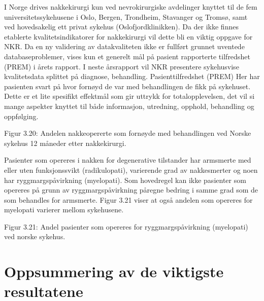 \documentclass [norsk,a4paper,twoside]{article}\usepackage[]{graphicx}\usepackage[]{color}
\begin{document}
I Norge drives nakkekirurgi kun ved nevrokirurgiske avdelinger knyttet til de fem
universitetssykehusene i Oslo, Bergen, Trondheim, Stavanger og Tromsø, samt ved
hovedsakelig ett privat sykehus (Oslofjordklinikken).
Da der ikke finnes etablerte kvalitetsindikatorer for nakkekirurgi vil dette bli en
viktig oppgave for NKR. Da en ny validering av datakvaliteten ikke er fullført grunnet
uventede databaseproblemer, vises kun et generelt mål på pasient rapporterte
tilfredshet (PREM) i årets rapport. I neste årsrapport vil NKR presentere sykehusvise
kvalitetsdata splittet på diagnose, behandling.
Pasienttilfredshet (PREM)
Her har pasienten svart på hvor fornøyd de var med behandlingen de fikk på
sykehuset. Dette er et lite spesifikt effektmål som gir uttrykk for totalopplevelsen,
det vil si mange aspekter knyttet til både informasjon, utredning, opphold,
behandling og oppfølging.

Figur 3.20: Andelen nakkeopererte som fornøyde med behandlingen ved Norske
sykehus 12 måneder etter nakkekirurgi.

Pasienter som opereres i nakken for degenerative tilstander har armsmerte med
eller uten funksjonssvikt (radikulopati), varierende grad av nakkesmerter og noen
har ryggmargspåvirkning (myelopati). Som hovedregel kan ikke pasienter som
opereres på grunn av ryggmargspåvirkning påregne bedring i samme grad som de
som behandles for armsmerte. Figur 3.21 viser at også andelen som opereres for
myelopati varierer mellom sykehusene.

Figur 3.21: Andel pasienter som opereres for ryggmargspåvirkning (myelopati) ved
norske sykehus.


\section{Oppsummering av de viktigste resultatene}
\end{document}
